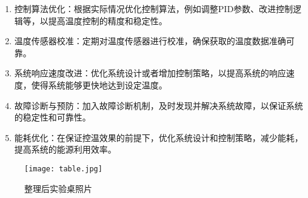 \documentclass[dvipsnames, svgnames,a4paper,11pt]{article}
\begin{document}
        \begin{enumerate}
            \item 控制算法优化：根据实际情况优化控制算法，例如调整PID参数、改进控制逻辑等，以提高温度控制的精度和稳定性。
            \item 温度传感器校准：定期对温度传感器进行校准，确保获取的温度数据准确可靠。
            \item 系统响应速度改进：优化系统设计或者增加控制策略，以提高系统的响应速度，使得系统能够更快地达到设定温度。
            \item 故障诊断与预防：加入故障诊断机制，及时发现并解决系统故障，以保证系统的稳定性和可靠性。
            \item 能耗优化：在保证控温效果的前提下，优化系统设计和控制策略，减少能耗，提高系统的能源利用效率。
        \end{enumerate}




        \begin{figure}[htbp]
            \centering
            \texttt{[image: table.jpg]}
            \caption{整理后实验桌照片}
            \label{fig:table}
        \end{figure}
\end{document}
